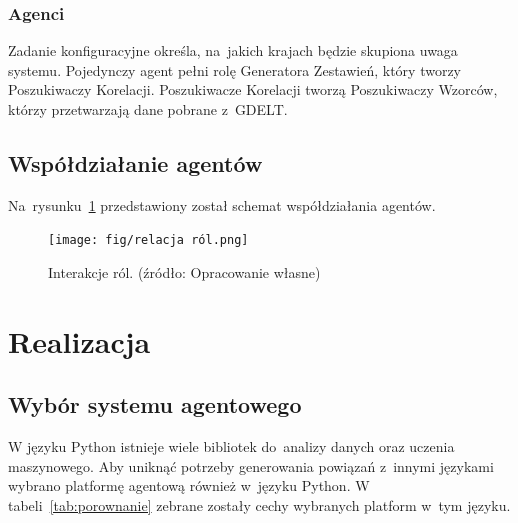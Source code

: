 \documentclass[11pt]{report}
\begin{document}
    \subsection{Agenci}
    Zadanie konfiguracyjne określa, na~jakich krajach będzie skupiona uwaga systemu.
    Pojedynczy agent pełni rolę Generatora Zestawień, który tworzy Poszukiwaczy Korelacji.
    Poszukiwacze Korelacji tworzą Poszukiwaczy Wzorców, którzy przetwarzają dane pobrane z~GDELT\@.


    \section{Współdziałanie agentów}
    Na~rysunku~\ref{fig:relacje} przedstawiony został schemat współdziałania agentów.

    \begin{figure}[!ht]
        \centering
        \texttt{[image: fig/relacja ról.png]}
        \caption{Interakcje ról. (źródło: Opracowanie własne)}
        \label{fig:relacje}
    \end{figure}


    \chapter{Realizacja}\label{ch:realizacja}


    \section{Wybór systemu agentowego}

    W języku Python istnieje wiele bibliotek do~analizy danych oraz uczenia maszynowego.
    Aby uniknąć potrzeby generowania powiązań z~innymi językami wybrano platformę agentową również w~języku Python.
    W tabeli~\ref{tab:porownanie} zebrane zostały cechy wybranych platform w~tym języku.
\end{document}
